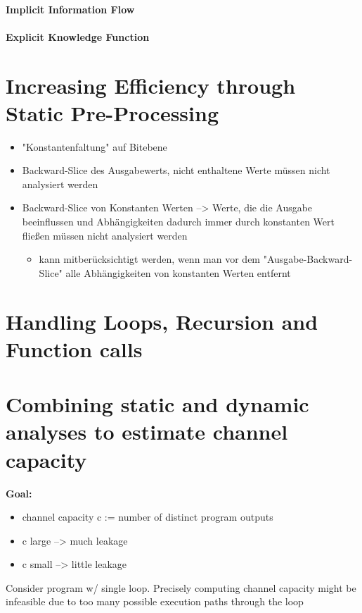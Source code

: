 \paragraph{Implicit Information Flow}


\paragraph{Explicit Knowledge Function}


\section{Increasing Efficiency through Static Pre-Processing}
\begin{itemize}
    \item "Konstantenfaltung" auf Bitebene
    \item Backward-Slice des Ausgabewerts, nicht enthaltene Werte müssen nicht analysiert werden
    \item Backward-Slice von Konstanten Werten --> Werte, die die Ausgabe beeinflussen und Abhängigkeiten dadurch immer durch konstanten Wert fließen müssen nicht analysiert werden
\begin{itemize}
    \item kann mitberücksichtigt werden, wenn man vor dem "Ausgabe-Backward-Slice" alle Abhängigkeiten von konstanten Werten entfernt 
\end{itemize}
\end{itemize}

\section{Handling Loops, Recursion and Function calls}

\section{Combining static and dynamic analyses to estimate channel capacity}
\textbf{Goal:}
\begin{itemize}
    \item channel capacity c := number of distinct program outputs
    \item c large --> much leakage
    \item c small --> little leakage
\end{itemize}
Consider program w/ single loop. Precisely computing channel capacity might be infeasible due to too many possible execution paths through the loop

